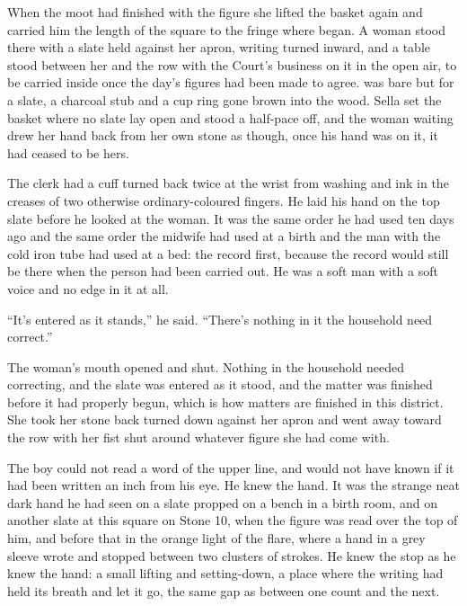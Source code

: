 \scenebreak

When the moot had finished with the figure she lifted the basket again and carried him the length of the square to the fringe where  began. A woman stood there with a slate held against her apron, writing turned inward, and a table stood between her and the row with the Court's business on it in the open air, to be carried inside once the day's figures had been made to agree.  was bare but for a slate, a charcoal stub and a cup ring gone brown into the wood. Sella set the basket where no slate lay open and stood a half-pace off, and the woman waiting drew her hand back from her own stone as though, once his hand was on it, it had ceased to be hers.

The clerk had a cuff turned back twice at the wrist from washing and ink in the creases of two otherwise ordinary-coloured fingers. He laid his hand on the top slate before he looked at the woman. It was the same order he had used ten days ago and the same order the midwife had used at a birth and the man with the cold iron tube had used at a bed: the record first, because the record would still be there when the person had been carried out. He was a soft man with a soft voice and no edge in it at all.

“It's entered as it stands,” he said. “There's nothing in it the household need correct.”

The woman's mouth opened and shut. Nothing in the household needed correcting, and the slate was entered as it stood, and the matter was finished before it had properly begun, which is how matters are finished in this district. She took her stone back turned down against her apron and went away toward the row with her fist shut around whatever figure she had come with.

The boy could not read a word of the upper line, and would not have known  if it had been written an inch from his eye. He knew the hand. It was the strange neat dark hand he had seen on a slate propped on a bench in a birth room, and on another slate at this square on Stone 10, when the figure was read over the top of him, and before that in the orange light of the flare, where a hand in a grey sleeve wrote and stopped between two clusters of strokes. He knew the stop as he knew the hand: a small lifting and setting-down, a place where the writing had held its breath and let it go, the same gap as between one count and the next.

